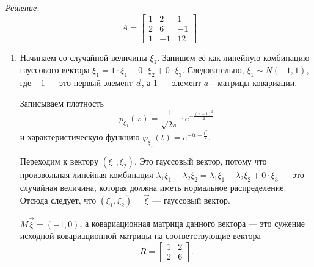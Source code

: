 \textit{Решение.}
$$A =
  \begin{bmatrix}
    1 & 2 & 1 \\
    2 & 6 & -1 \\
    1 & -1 & 12
  \end{bmatrix}$$

\begin{enumerate}[label=\alph*)]
  \item Начинаем со случайной величины $ \xi_1$.
  Запишем её как линейную комбинацию гауссового вектора
  $ \xi_1 =
    1 \cdot \xi_1 + 0 \cdot \xi_2 + 0 \cdot \xi_3$.
  Следовательно, $ \xi_1 \sim N \left( -1, 1 \right) $, где $-1$ --- это первый элемент $ \vec{a}$,
  а 1 --- элемент $a_{11}$ матрицы ковариации.

  Записываем плотность
  $$p_{ \xi_1} \left( x \right) =
    \frac{1}{ \sqrt{2 \pi }} \cdot e^{- \frac{ \left( x + 1 \right)^2}{2}}$$
  и характеристическую функцию $ \varphi_{ \xi_1} \left( t \right) = e^{-it - \frac{t^2}{2}}$.

  Переходим к вектору $ \left( \xi_1, \xi_2 \right) $.
  Это гауссовый вектор,
  потому что произвольная линейная комбинация
  $ \lambda_1 \xi_1 + \lambda_2 \xi_2 = \lambda_1 \xi_1 + \lambda_2 \xi_2 + 0 \cdot \xi_3$ ---
  это случайная величина, которая должна иметь нормальное распределение.
  Отсюда следует, что $ \left( \xi_1, \xi_2 \right) = \vec{ \xi }$ --- гауссовый вектор.

  $M \vec{ \xi } = \left( -1, 0 \right) $, а ковариационная матрица данного вектора ---
  это сужение исходной ковариационной матрицы на соответствующие вектора
  $$R =
    \begin{bmatrix}
      1 & 2 \\
      2 & 6
    \end{bmatrix}.$$


\end{enumerate}

